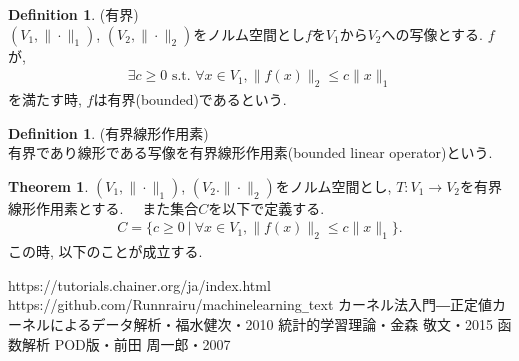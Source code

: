 \documentclass[11pt, a4paper, dvipdfmx]{jsarticle}
\theoremstyle{definition}
\newtheorem{Definition+}[Axiom+]{Definition}
\newtheorem{Theorem+}[Axiom+]{Theorem}
\begin{document}
\begin{Definition+}(有界)\\
    $(V_{1}, \|\cdot\|_{1})$, $(V_{2}, \|\cdot\|_{2})$をノルム空間とし$f$を$V_{1}$から$V_{2}$への写像とする.
    $f$が,
    \begin{align*}
        \exists c\geq 0\text{ s.t. }\forall x\in V_{1}, \|f(x)\|_{2}\leq c\|x\|_{1}
    \end{align*}
    を満たす時, $f$は有界(bounded)であるという.
\end{Definition+}

\begin{Definition+}(有界線形作用素)\\
    有界であり線形である写像を有界線形作用素(bounded linear operator)という.
\end{Definition+}
\newpage
\begin{Theorem+}
    $(V_{1}, \|\cdot\|_{1})$, $(V_2. \|\cdot\|_{2})$をノルム空間とし, $T:V_1\to V_2$を有界線形作用素とする.　
    また集合$C$を以下で定義する.
    \begin{align*}
        C = \{c\geq 0~|~\forall x\in V_{1}, \|f(x)\|_{2}\leq c\|x\|_{1}\}.
    \end{align*}
    この時, 以下のことが成立する.
\end{Theorem+}

\begin{thebibliography}{9}
     https://tutorials.chainer.org/ja/index.html
     https://github.com/Runnrairu/machinelearning\verb|_|text
     カーネル法入門―正定値カーネルによるデータ解析・福水健次・2010
     統計的学習理論・金森 敬文・2015
     函数解析 POD版・前田 周一郎・2007
\end{thebibliography}
\end{document}
